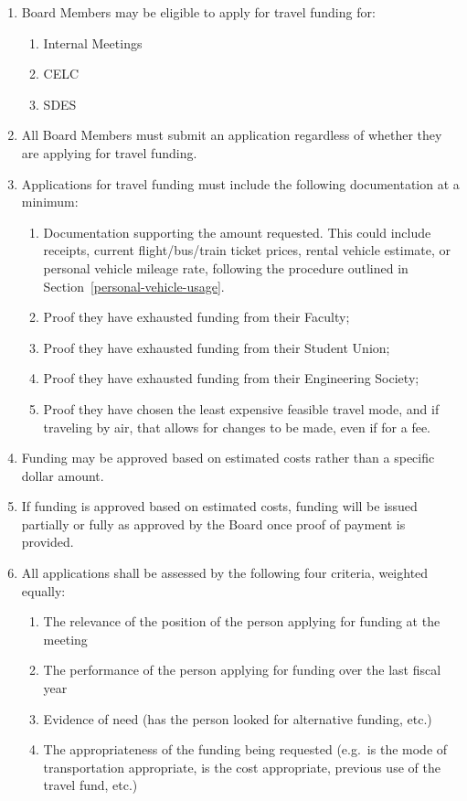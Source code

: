 \begin{enumerate}
 \item
  Board Members may be eligible to apply for travel funding for:

  \begin{enumerate}
   \item
    Internal Meetings
   \item
    CELC
   \item
    SDES
  \end{enumerate}

 \item
  All Board Members must submit an application regardless of whether they are applying for travel funding.
 \item
  Applications for travel funding must include the following documentation at a minimum:

  \begin{enumerate}
   \item
    Documentation supporting the amount requested. This could include receipts, current flight/bus/train ticket prices, rental vehicle estimate, or personal vehicle mileage rate, following the procedure outlined in Section~\ref{personal-vehicle-usage}.
   \item
    Proof they have exhausted funding from their Faculty;
   \item
    Proof they have exhausted funding from their Student Union;
   \item
    Proof they have exhausted funding from their Engineering Society;
   \item
    Proof they have chosen the least expensive feasible travel mode, and if traveling by air, that allows for changes to be made, even if for a fee.
  \end{enumerate}

 \item
  Funding may be approved based on estimated costs rather than a specific dollar amount.
 \item
  If funding is approved based on estimated costs, funding will be issued partially or fully as approved by the Board once proof of payment is provided.
 \item
  All applications shall be assessed by the following four criteria, weighted equally:

  \begin{enumerate}
   \item
    The relevance of the position of the person applying for funding at the meeting
   \item
    The performance of the person applying for funding over the last fiscal year
   \item
    Evidence of need (has the person looked for alternative funding, etc.)
   \item
    The appropriateness of the funding being requested (e.g.~is the mode of transportation appropriate, is the cost appropriate, previous use of the travel fund, etc.)
  \end{enumerate}
\end{enumerate}

